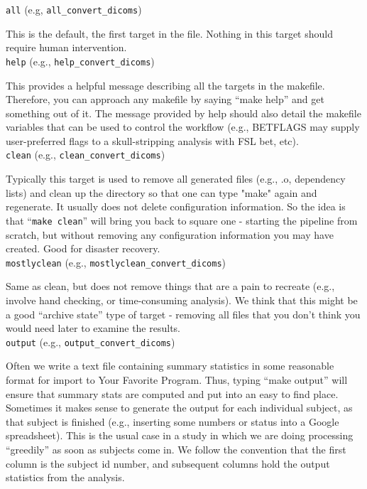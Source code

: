 \texttt{all} (e.g, \texttt{all_convert_dicoms}) 

This is the default, the first target in the file. Nothing in this target should require human intervention. \\

\texttt{help} (e.g., \texttt{help_convert_dicoms})

This provides a helpful message describing all the targets in the makefile. Therefore, you can approach any makefile by saying ``make help'' and get something out of it. The message provided by help should also detail the makefile variables that can be used to control the workflow (e.g., BETFLAGS may supply user-preferred flags to a skull-stripping analysis with FSL bet, etc). \\

\texttt{clean} (e.g., \texttt{clean_convert_dicoms})

Typically this target is used to remove all generated files (e.g., .o, dependency lists) and clean up the directory so that one can type "make" again and regenerate. It usually does not delete configuration information. So the idea is that ``\texttt{make clean}'' will bring you back to square one - starting the pipeline from scratch, but without removing any configuration information you may have created. Good for disaster recovery. \\

\texttt{mostlyclean} (e.g., \texttt{mostlyclean_convert_dicoms})

Same as clean, but does not remove things that are a pain to recreate (e.g., involve hand checking, or time-consuming analysis). We think that this might be a good ``archive state'' type of target - removing all files that you don't think you would need later to examine the results. \\

\texttt{output} (e.g., \texttt{output_convert_dicoms})

Often we write a text file containing summary statistics in some reasonable format for import to Your Favorite Program. Thus, typing ``make output'' will ensure that summary stats are computed and put into an easy to find place. Sometimes it makes sense to generate the output for each individual subject, as that subject is finished (e.g., inserting some numbers or status into a Google spreadsheet). This is the usual case in a study in which we are doing processing ``greedily'' as soon as subjects come in. We follow the convention that the first column is the subject id number, and subsequent columns hold the output statistics from the analysis.

